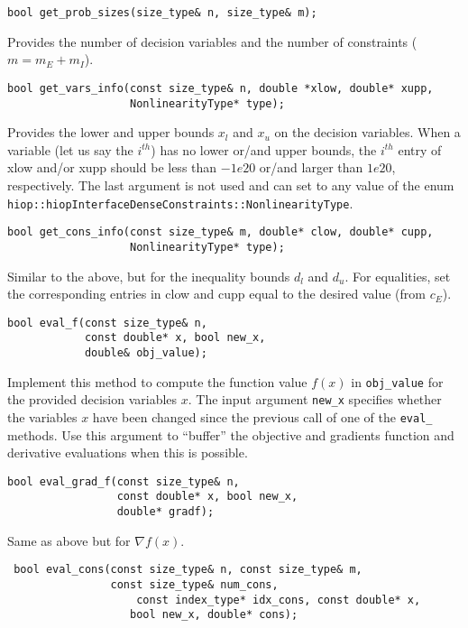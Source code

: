 \documentclass[11pt]{article}
\newcounter{line}
\begin{document}
\begin{lstlisting} 
bool get_prob_sizes(size_type& n, size_type& m);
\end{lstlisting} 
\noindent Provides the number of decision variables and the number of constraints ($m=m_E+m_I$).


\begin{lstlisting} 
bool get_vars_info(const size_type& n, double *xlow, double* xupp, 
                   NonlinearityType* type);
\end{lstlisting} 

\noindent Provides the lower and upper bounds $x_l$ and $x_u$ on the decision variables. When a variable (let us say the $i^{th}$) has no lower or/and upper bounds, the  $i^{th}$ entry of xlow and/or xupp should be less than $-1e20$ or/and larger than $1e20$, respectively. The last argument is not used and can set to any value of the enum \texttt{hiop::hiopInterfaceDenseConstraints::NonlinearityType}.

\begin{lstlisting} 
bool get_cons_info(const size_type& m, double* clow, double* cupp, 
                   NonlinearityType* type);
\end{lstlisting}
\noindent Similar to the above, but for the inequality bounds $d_l$ and $d_u$. For equalities, set the corresponding entries in clow and cupp equal to the desired value (from $c_E$).


\begin{lstlisting} 
bool eval_f(const size_type& n, 
            const double* x, bool new_x, 
            double& obj_value);
\end{lstlisting} 

\noindent Implement this method to compute the function value $f(x)$ in \texttt{obj\_value} for the provided decision variables $x$. The input argument \texttt{new\_x} specifies whether the variables $x$ have been changed since the previous call of one of the \texttt{eval\_} methods. Use this argument to ``buffer'' the objective and gradients function and derivative evaluations when this is possible.

\begin{lstlisting} 
bool eval_grad_f(const size_type& n, 
                 const double* x, bool new_x, 
                 double* gradf);
\end{lstlisting} 

\noindent Same as above but for $\nabla f(x)$.

\begin{lstlisting} 
 bool eval_cons(const size_type& n, const size_type& m, 
                const size_type& num_cons,
				    const index_type* idx_cons, const double* x, 
			       bool new_x, double* cons);
\end{lstlisting} 
\end{document}
